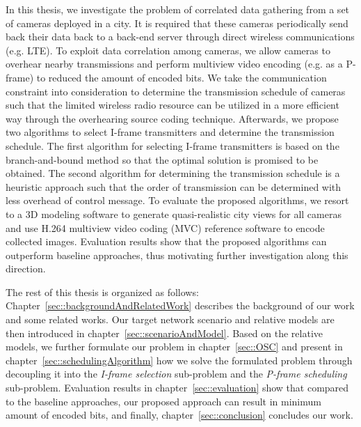 In this thesis, we investigate the problem of correlated data gathering from a set of cameras deployed in a city.
It is required that these cameras periodically send back their data back to a back-end server through direct wireless communications (e.g. LTE).
To exploit data correlation among cameras, we allow cameras to overhear nearby transmissions and perform multiview video encoding (e.g. as a P-frame) to reduced the amount of encoded bits.
We take the communication constraint into consideration to determine the transmission schedule of cameras such that the limited wireless radio resource can be utilized in a more efficient way through the overhearing source coding technique.
Afterwards, we propose two algorithms to select I-frame transmitters and determine the transmission schedule.
The first algorithm for selecting I-frame transmitters is based on the branch-and-bound method so that the optimal solution is promised to be obtained.
The second algorithm for determining the transmission schedule is a heuristic approach such that the order of transmission can be determined with less overhead of control message.
To evaluate the proposed algorithms, we resort to a 3D modeling software to generate quasi-realistic city views for all cameras and use H.264 multiview video coding (MVC) reference software to encode collected images.
Evaluation results show that the proposed algorithms can outperform baseline approaches, thus motivating further investigation along this direction.

The rest of this thesis is organized as follows:
Chapter~\ref{sec::backgroundAndRelatedWork} describes the background of our work and some related works.
Our target network scenario and relative models are then introduced in chapter~\ref{sec::scenarioAndModel}.
Based on the relative models, we further formulate our problem in chapter~\ref{sec::OSC} and present in chapter~\ref{sec::schedulingAlgorithm} how we solve the formulated problem through decoupling it into the {\em I-frame selection} sub-problem and the {\em P-frame scheduling} sub-problem. 
Evaluation results in chapter~\ref{sec::evaluation} show that compared to the baseline approaches, our proposed approach can result in minimum amount of encoded bits, and finally, chapter~\ref{sec::conclusion} concludes our work.